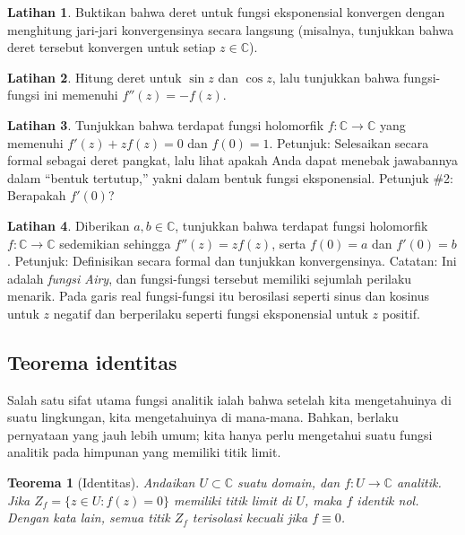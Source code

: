 \documentclass[12pt,openany]{book}
\newcommand{\C}{{\mathbb{C}}}
\newcommand{\myindex}[1]{#1\index{#1}}
\newcommand{\myquote}[1]{``#1''}
\theoremstyle{plain}
\newtheorem{thm}{Teorema}[section]
\theoremstyle{remark}
\theoremstyle{definition}
\newenvironment{exbox}{%
    \def\FrameCommand{\vrule width 1pt \relax\hspace{10pt}}%
    \MakeFramed{\advance\hsize-\width\FrameRestore}%
}{%
    \endMakeFramed
}
\theoremstyle{exercise}
\newtheorem{exercise}{Latihan}[section]
\theoremstyle{example}
\begin{document}
\begin{exbox}
\begin{exercise}
Buktikan bahwa deret untuk fungsi eksponensial konvergen dengan menghitung
jari-jari konvergensinya secara langsung
(misalnya, tunjukkan bahwa deret tersebut konvergen untuk setiap $z \in \C$).
\end{exercise}

\begin{exercise}
Hitung deret untuk $\sin z$ dan $\cos z$, lalu tunjukkan bahwa fungsi-fungsi ini memenuhi
$f''(z) = -f(z)$.
\end{exercise}

\begin{exercise}
Tunjukkan bahwa terdapat fungsi holomorfik $f \colon \C \to \C$ yang
memenuhi $f'(z) + z f(z) = 0$ dan $f(0) = 1$.  Petunjuk: Selesaikan secara formal
sebagai deret pangkat,
lalu lihat apakah Anda dapat menebak jawabannya dalam \myquote{bentuk tertutup,} yakni dalam
bentuk fungsi eksponensial.  Petunjuk \#2: Berapakah $f'(0)$?
\end{exercise}

\begin{exercise}
Diberikan $a,b \in \C$, tunjukkan bahwa terdapat fungsi holomorfik $f \colon \C \to
\C$ sedemikian sehingga $f''(z) = z f(z)$, serta $f(0) = a$ dan $f'(0) = b$.
Petunjuk: Definisikan secara formal dan tunjukkan konvergensinya.
Catatan: Ini adalah \emph{\myindex{fungsi Airy}}, dan fungsi-fungsi tersebut memiliki sejumlah
perilaku menarik.  Pada garis real fungsi-fungsi itu berosilasi seperti sinus dan kosinus
untuk $z$ negatif dan berperilaku seperti fungsi eksponensial untuk $z$ positif.
\end{exercise}
\end{exbox}

\subsection{Teorema identitas}

Salah satu sifat utama fungsi analitik ialah bahwa setelah kita mengetahuinya
di suatu lingkungan, kita mengetahuinya di mana-mana.  Bahkan, berlaku pernyataan yang jauh lebih
umum; kita hanya perlu mengetahui suatu fungsi analitik pada himpunan yang memiliki
titik limit.

\begin{thm}[Identitas]%
\label{thm:identity}
Andaikan $U \subset \C$ suatu domain,
dan $f \colon U \to \C$ analitik.
Jika $Z_f = \bigl\{ z \in U : f(z) = 0 \bigr\}$
memiliki titik limit di $U$, maka $f$ identik nol.
Dengan kata lain, semua titik $Z_f$ terisolasi kecuali jika $f \equiv 0$.
\end{thm}
\end{document}
